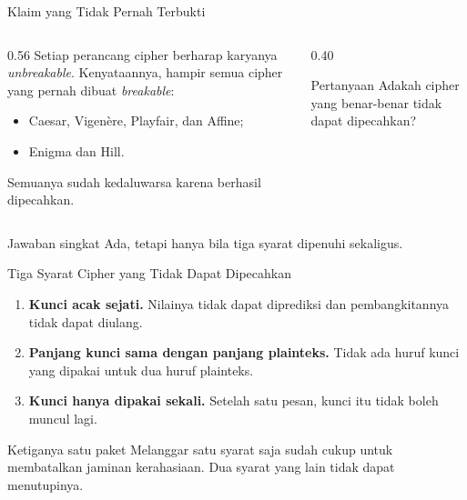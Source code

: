 \documentclass[aspectratio=169,11pt]{beamer}
\begin{document}
\begin{frame}{Klaim yang Tidak Pernah Terbukti}
    \begin{columns}[T,onlytextwidth]
        \begin{column}{0.56\textwidth}
            \footnotesize
            Setiap perancang cipher berharap karyanya \emph{unbreakable}.
            Kenyataannya, hampir semua cipher yang pernah dibuat
            \emph{breakable}:
            \begin{itemize}
                \item Caesar, Vigen\`ere, Playfair, dan Affine;
                \item Enigma dan Hill.
            \end{itemize}
            Semuanya sudah kedaluwarsa karena berhasil dipecahkan.
        \end{column}
        \begin{column}{0.40\textwidth}
            \begin{alertblock}{Pertanyaan}
                \footnotesize
                Adakah cipher yang benar-benar tidak dapat dipecahkan?
            \end{alertblock}
        \end{column}
    \end{columns}
    \vspace{0.25cm}
    \begin{block}{Jawaban singkat}
        Ada, tetapi hanya bila tiga syarat dipenuhi sekaligus.
    \end{block}
\end{frame}

\begin{frame}{Tiga Syarat Cipher yang Tidak Dapat Dipecahkan}
    \footnotesize
    \begin{enumerate}
        \item \textbf{Kunci acak sejati.} Nilainya tidak dapat diprediksi
              dan pembangkitannya tidak dapat diulang.
        \item \textbf{Panjang kunci sama dengan panjang plainteks.}
              Tidak ada huruf kunci yang dipakai untuk dua huruf plainteks.
        \item \textbf{Kunci hanya dipakai sekali.} Setelah satu pesan,
              kunci itu tidak boleh muncul lagi.
    \end{enumerate}
    \vspace{0.25cm}
    \begin{alertblock}{Ketiganya satu paket}
        Melanggar satu syarat saja sudah cukup untuk membatalkan jaminan
        kerahasiaan. Dua syarat yang lain tidak dapat menutupinya.
    \end{alertblock}
\end{frame}
\end{document}
